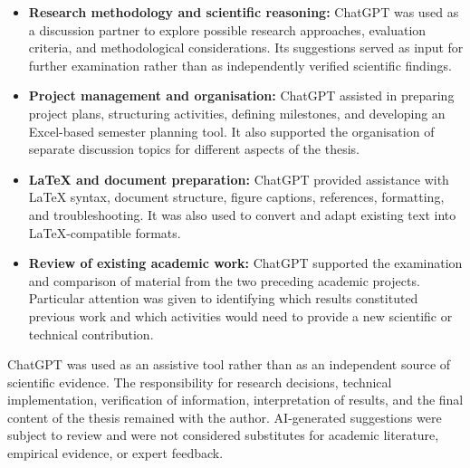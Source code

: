 {\begin{itemize}
    \item \textbf{Research methodology and scientific reasoning:}
    ChatGPT was used as a discussion partner to explore possible research approaches, evaluation criteria, and methodological considerations. Its suggestions served as input for further examination rather than as independently verified scientific findings.

    \item \textbf{Project management and organisation:}
    ChatGPT assisted in preparing project plans, structuring activities, defining milestones, and developing an Excel-based semester planning tool. It also supported the organisation of separate discussion topics for different aspects of the thesis.

    \item \textbf{\LaTeX{} and document preparation:}
    ChatGPT provided assistance with \LaTeX{} syntax, document structure, figure captions, references, formatting, and troubleshooting. It was also used to convert and adapt existing text into \LaTeX{}-compatible formats.

    \item \textbf{Review of existing academic work:}
    ChatGPT supported the examination and comparison of material from the two preceding academic projects. Particular attention was given to identifying which results constituted previous work and which activities would need to provide a new scientific or technical contribution.
\end{itemize}

ChatGPT was used as an assistive tool rather than as an independent source of scientific evidence. The responsibility for research decisions, technical implementation, verification of information, interpretation of results, and the final content of the thesis remained with the author. AI-generated suggestions were subject to review and were not considered substitutes for academic literature, empirical evidence, or expert feedback.
}